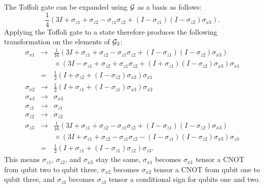 \documentclass{report}
\newcommand{\G}{{\cal G}}
\newcommand{\Xs}[1]{\sigma_{x{#1}}}
\newcommand{\Zs}[1]{\sigma_{z{#1}}}
\begin{document}
The Toffoli gate can be expanded using $\G$ as a basis as follows:
\begin{equation}
\frac{1}{4} \left( 3 I + \Zs{1} + \Zs{2} - \Zs{1} \Zs{2} + (I - \Zs{1}) (I - 
\Zs{2}) \Xs{3} 
\right).
\end{equation}
Applying the Toffoli gate to a state therefore produces the following 
transformation on the elements of $\G_3$:
\begin{eqnarray}
\Xs{1} & \rightarrow & \frac{1}{16} \left( 3 I + \Zs{1} + \Zs{2} - \Zs{1} \Zs{2}
+ (I - \Zs{1}) (I - \Zs{2}) \Xs{3} \right) \nonumber \\
& & \mbox{} \times \left( 3 I - \Zs{1} + \Zs{2} + \Zs{1}
\Zs{2} + (I + \Zs{1}) (I - \Zs{2}) \Xs{3} \right) \Xs{1} \nonumber \\
& = & \frac{1}{2} \left(I + \Zs{2} + (I - \Zs{2}) \Xs{3} \right) \Xs{1}
\nonumber \\
\Xs{2} & \rightarrow & \frac{1}{2} \left(I + \Zs{1} + (I - \Zs{1}) \Xs{3}
\right) \Xs{2} \nonumber \\
\Xs{3} & \rightarrow & \Xs{3} \label{eq-toffoli} \\
\Zs{1} & \rightarrow & \Zs{1} \nonumber \\
\Zs{2} & \rightarrow & \Zs{2} \nonumber \\
\Zs{3} & \rightarrow & \frac{1}{16} \left( 3 I + \Zs{1} + \Zs{2} - \Zs{1} \Zs{2}
+ (I - \Zs{1}) (I - \Zs{2}) \Xs{3} \right) \nonumber \\
& & \mbox{} \times \left( 3 I + \Zs{1} + \Zs{2} - \Zs{1} 
\Zs{2} - (I - \Zs{1}) (I - \Zs{2}) \Xs{3} \right) \Zs{3} \nonumber \\
& = & \frac{1}{2} \left(I + \Zs{1} + (I - \Zs{1}) \Zs{2} \right) \Zs{3}.
\nonumber
\end{eqnarray}
This means $\Zs{1}$, $\Zs{2}$, and $\Xs{3}$ stay the same, $\Xs{1}$ becomes 
$\Xs{1}$ tensor a CNOT from qubit two to qubit three, $\Xs{2}$ becomes $\Xs{2}$ 
tensor a CNOT from qubit one to qubit three, and $\Zs{3}$ becomes $\Zs{3}$ 
tensor a conditional sign for qubits one and two.
\end{document}
